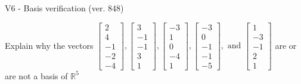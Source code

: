 \begin{exercise}
  \begin{exerciseTitle}V6 - Basis verification (ver. 848)\end{exerciseTitle}
  \begin{exerciseStatement}
    Explain why the vectors \(\left[\begin{array}{r}
2 \\
4 \\
-1 \\
-2 \\
-4
\end{array}\right] , \left[\begin{array}{r}
3 \\
-1 \\
-1 \\
3 \\
1
\end{array}\right] , \left[\begin{array}{r}
-3 \\
1 \\
0 \\
-4 \\
1
\end{array}\right] , \left[\begin{array}{r}
-3 \\
0 \\
-1 \\
-1 \\
-5
\end{array}\right] , \text{ and } \left[\begin{array}{r}
1 \\
-3 \\
-1 \\
2 \\
1
\end{array}\right]\) are or are not a basis of \(\mathbb{R}^5\)	



\end{exerciseStatement}
\end{exercise}

